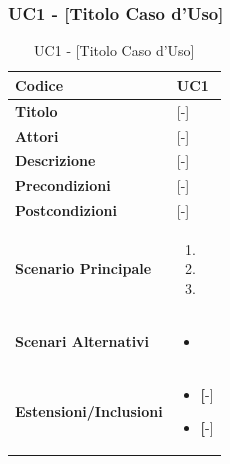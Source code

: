 \subsubsection{UC1 - {[Titolo Caso d'Uso]}}
\begin{table}[ht]
	\centering
	\renewcommand{\arraystretch}{1.4}
	\begin{tabularx}{\textwidth}{|l|X|}
		\hline
		\textbf{Codice} & \textbf{UC1} \\
		\hline
		\textbf{Titolo} & {[-]} \\
		\hline
		\textbf{Attori} & {[-]} \\
		\hline
		\textbf{Descrizione} & {[-]} \\
		\hline
		\textbf{Precondizioni} & {[-]} \\
		\hline
		\textbf{Postcondizioni} & {[-]} \\
		\hline
		\textbf{Scenario Principale} & 
		\vspace{-0.4cm}
		\begin{enumerate}[leftmargin=*]
			\item [-]
			\item [-]
			\item [-]
		\end{enumerate} \\
		\hline
		\textbf{Scenari Alternativi} & 
		\vspace{-0.4cm}
		\begin{itemize}[leftmargin=*]
			\item [-]
		\end{itemize} \\
		\hline
		\textbf{Estensioni/Inclusioni} & 
		\vspace{-0.4cm}
		\begin{itemize}[leftmargin=*]
			\item \textbf [-]
			\item \textbf [-]
		\end{itemize} \\
		\hline
	\end{tabularx}
	\caption{UC1 - {[Titolo Caso d'Uso]}}
\end{table}

\vspace{0.5cm}
